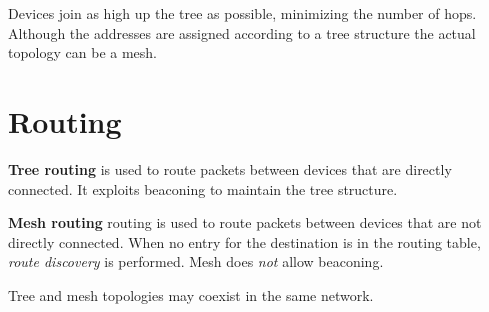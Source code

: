 Devices join as high up the tree as possible, minimizing the number of hops.
Although the addresses are assigned according to a tree structure the actual topology can be a mesh.

\section{Routing}
\textbf{Tree routing} is used to route packets between devices that are directly connected.
It exploits beaconing to maintain the tree structure.

\textbf{Mesh routing} routing is used to route packets between devices that are not directly connected.
When no entry for the destination is  in the routing table, \textit{route discovery} is performed.
Mesh does \textit{not} allow beaconing.

Tree and mesh topologies may coexist in the same network.